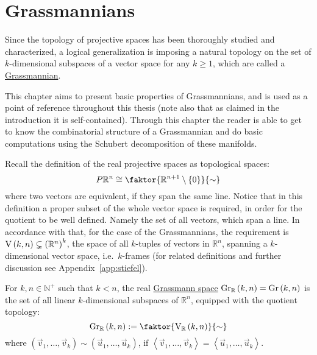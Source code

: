 \chapter{Grassmannians}
Since the topology of projective spaces has been thoroughly studied and characterized, a logical generalization is imposing a natural topology on the set of $k$-dimensional subspaces of a vector space for any $k\geq1$, which are called a \ul{Grassmannian}.

This chapter aims to present basic properties of Grassmannians, and is used as a point of reference throughout this thesis (note also that as claimed in the introduction it is self-contained).
Through this chapter the reader is able to get to know the combinatorial structure of a Grassmannian and do basic computations using the Schubert decomposition of these manifolds.

Recall the definition of the real projective spaces as topological spaces:
\[P\mathbb{R}^n\cong\faktor{\mathbb{R}^{n+1}\setminus\{0\}}{\sim}\]
where two vectors are equivalent, if they span the same line. Notice that in this definition a proper subset of the whole vector space is required, in order for the quotient to be well defined. Namely the set of all vectors, which span a line. In accordance with that, for the case of the Grassmannians, the requirement is $\St{k}{n}\subsetneq{\left(\mathbb{R}^n\right)}^k$, the space of all $k$-tuples of vectors in $\mathbb{R}^n$, spanning a $k$-dimensional vector space, i.e.\ $k$-frames (for related definitions and further discussion see Appendix~\ref{app:stiefel}).

\begin{definition} For $k,n\in\mathbb N^+$ such that $k<n$, the real \ul{Grassmann space} $\Gr{k}{n}{\mathbb{R}}=\Gr{k}{n}$ is the set of all linear $k$-dimensional subspaces of $\mathbb{R}^n$, equipped with the quotient topology:
\[\Gr{k}{n}{\mathbb{R}}:=\faktor{\St{k}{n}{\mathbb{R}}}{\sim}\]
where $(\vec{v}_1,\ldots,\vec{v}_k)\sim(\vec{u}_1,\ldots,\vec{u}_k)$, if $\left<\vec{v}_1,\ldots,\vec{v}_k\right>=\left<\vec{u}_1,\ldots,\vec{u}_k\right>$.
\end{definition}

